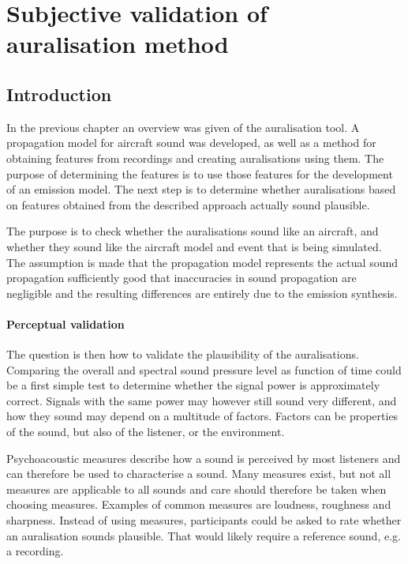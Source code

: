\chapter{Subjective validation of auralisation method}\label{chapter:test}

\section{Introduction}
In the previous chapter an overview was given of the auralisation tool. A
propagation model for aircraft sound was developed, as well as a method for
obtaining features from recordings and creating auralisations using them. The
purpose of determining the features is to use those features for the development
of an emission model.  The next step is to determine whether auralisations based
on features obtained from the described approach actually sound plausible.

The purpose is to check whether the auralisations sound like an aircraft, and
whether they sound like the aircraft model and event that is being simulated.
The assumption is made that the propagation model represents the actual sound
propagation sufficiently good that inaccuracies in sound propagation are
negligible and the resulting differences are entirely due to the emission
synthesis.

\subsubsection*{Perceptual validation}
The question is then how to validate the plausibility of the auralisations.
Comparing the overall and spectral sound pressure level as function of time
could be a first simple test to determine whether the signal power is approximately
correct. Signals with the same power may however still sound very different,
and how they sound may depend on a multitude of factors. Factors can be properties
of the sound, but also of the listener, or the environment.

Psychoacoustic measures describe how a sound is perceived by most listeners and
can therefore be used to characterise a sound. Many measures exist, but not all
measures are applicable to all sounds and care should therefore be taken when
choosing measures. Examples of common measures are loudness, roughness and
sharpness. Instead of using measures, participants could be asked to rate
whether an auralisation sounds plausible. That would likely require a reference
sound, e.g. a recording.

